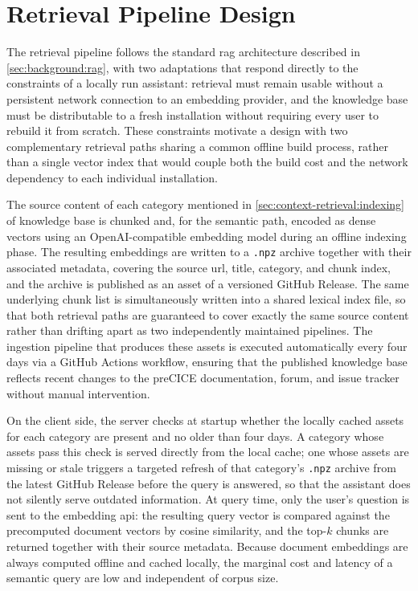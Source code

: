 \documentclass[
  numbers=noenddot,
  english,
  a4paper,
  twoside,
  bibliography=totoc,
  headsepline,
  cleardoublepage=empty,
  parskip=half,
  draft=false
]{scrbook}
\theoremstyle{break}
\renewcommand{\_}{\textunderscore\allowbreak}
\begin{document}
\section{Retrieval Pipeline Design}\label{sec:context-retrieval:design}

The retrieval pipeline follows the standard \gls{rag} architecture described in
\cref{sec:background:rag}, with two adaptations that respond directly to the constraints of a
locally run assistant: retrieval must remain usable without a persistent network connection to
an embedding provider, and the knowledge base must be distributable to a fresh installation
without requiring every user to rebuild it from scratch. These constraints motivate a design
with two complementary retrieval paths sharing a common offline build process, rather than a
single vector index that would couple both the build cost and the network dependency to each
individual installation.

The source content of each category mentioned in \cref{sec:context-retrieval:indexing} of knowledge base
is chunked and, for the semantic path, encoded as dense
vectors using an OpenAI-compatible embedding model during an offline indexing phase. The
resulting embeddings are written to a \texttt{.npz} archive together with their associated
metadata, covering the source \gls{url}, title, category, and chunk index, and the archive is
published as an asset of a versioned GitHub Release. The same underlying chunk list is
simultaneously written into a shared lexical index file, so that both retrieval paths are
guaranteed to cover exactly the same source content rather than drifting apart as two
independently maintained pipelines. The ingestion pipeline that produces these assets is
executed automatically every four days via a GitHub Actions workflow, ensuring that the
published knowledge base reflects recent changes to the preCICE documentation, forum, and
issue tracker without manual intervention.

On the client side, the server checks at startup whether the locally cached assets for each
category are present and no older than four days. A category whose assets pass this check is
served directly from the local cache; one whose assets are missing or stale triggers a
targeted refresh of that category's \texttt{.npz} archive from the latest GitHub Release
before the query is answered, so that the assistant does not silently serve outdated
information. At query time, only the user's question is sent to the embedding \gls{api}: the
resulting query vector is compared against the precomputed document vectors by cosine
similarity, and the top-$k$ chunks are returned together with their source metadata. Because
document embeddings are always computed offline and cached locally, the marginal cost and
latency of a semantic query are low and independent of corpus size.
\end{document}
